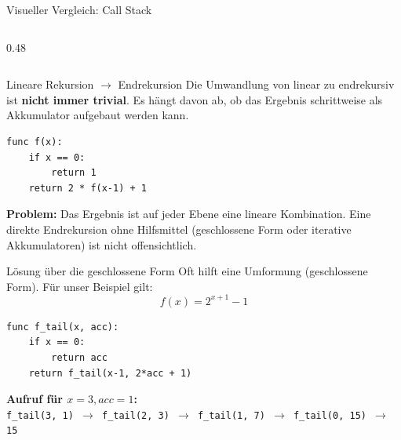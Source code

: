 \documentclass[aspectratio=169,11pt]{beamer}
\begin{document}
\begin{frame}[fragile]{Visueller Vergleich: Call Stack}
\begin{columns}[T]
\begin{column}{0.48\textwidth}
\begin{center}
            \end{center}
        \end{column}
    \end{columns}
\end{frame}

\begin{frame}[fragile]{Lineare Rekursion $\rightarrow$ Endrekursion}
    Die Umwandlung von linear zu endrekursiv ist \textbf{nicht immer trivial}. Es hängt davon ab, ob das Ergebnis schrittweise als Akkumulator aufgebaut werden kann.
    
    \begin{tcolorbox}[alertbox, title=Beispiel: $f(x) = 2 \cdot f(x-1) + 1$]
\begin{lstlisting}
func f(x):
    if x == 0:
        return 1
    return 2 * f(x-1) + 1
\end{lstlisting}
    \end{tcolorbox}
    \vspace{0.2cm}
    \small \textbf{Problem:} Das Ergebnis ist auf jeder Ebene eine lineare Kombination. Eine direkte Endrekursion ohne Hilfsmittel (geschlossene Form oder iterative Akkumulatoren) ist nicht offensichtlich.
\end{frame}

\begin{frame}[fragile]{Lösung über die geschlossene Form}
    Oft hilft eine Umformung (geschlossene Form). Für unser Beispiel gilt:
    \[ f(x) = 2^{x+1} - 1 \]
    
    \begin{tcolorbox}[modernbox, title=Iterative/Endrekursive Umsetzung]
\begin{lstlisting}
func f_tail(x, acc):
    if x == 0:
        return acc
    return f_tail(x-1, 2*acc + 1)
\end{lstlisting}
    \end{tcolorbox}
    \small
    \textbf{Aufruf für $x=3, acc=1$:} \\
    \texttt{f\_tail(3, 1) $\rightarrow$ f\_tail(2, 3) $\rightarrow$ f\_tail(1, 7) $\rightarrow$ f\_tail(0, 15) $\rightarrow$ 15}
\end{frame}
\end{document}
